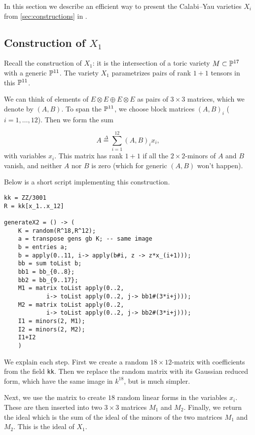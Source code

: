 In this section we describe an efficient way to present the Calabi--Yau varieties $X_i$ from \cref{sec:constructions} in \MM.

\subsection{Construction of $X_1$}

Recall the construction of $X_1$: it is the intersection of a toric variety $M \subset \P^{17}$ with a generic $\P^{11}$. The variety $X_1$ parametrizes pairs of rank $1+1$ tensors in this $\P^{11}$.

We can think of elements of $E \otimes E \oplus E \otimes E$ as pairs of $3 \times 3$ matrices, which we denote by $(A,B)$. To span the $\P^{11}$, we choose block matrices $\left(A,B\right)_i$ ($i=1,\ldots,12$). Then we form the sum

\[
A \stackrel \Delta = \sum_{i=1}^{12} (A,B)_i x_i,
\]
with variables $x_i$. This matrix has rank $1+1$ if all the $2 \times 2$-minors of $A$ and $B$ vanish, and neither $A$ nor $B$ is zero (which for generic $(A,B)$ won't happen). 

Below is a short \MM script implementing this construction.

\begin{minipage}{\linewidth}
\begin{lstlisting}[caption = Code for $X_1$, language=Macaulay2]
kk = ZZ/3001
R = kk[x_1..x_12]

generateX2 = () -> (
    K = random(R^18,R^12);
    a = transpose gens gb K; -- same image
    b = entries a;
    b = apply(0..11, i-> apply(b#i, z -> z*x_(i+1)));
    bb = sum toList b;
    bb1 = bb_{0..8};
    bb2 = bb_{9..17};
    M1 = matrix toList apply(0..2,
            i-> toList apply(0..2, j-> bb1#(3*i+j)));
    M2 = matrix toList apply(0..2,
            i-> toList apply(0..2, j-> bb2#(3*i+j)));
    I1 = minors(2, M1);
    I2 = minors(2, M2);
    I1+I2
    )
\end{lstlisting}
\end{minipage}

We explain each step. First we create a random $18 \times 12$-matrix with coefficients from the field \texttt{kk}. Then we replace the random matrix with its Gaussian reduced form, which have the same image in $k^{18}$, but is much simpler.

Next, we use the matrix to create $18$ random linear forms in the variables $x_i$. These are then inserted into two $3 \times 3$ matrices $M_1$ and $M_2$. Finally, we return the ideal which is the sum of the ideal of the minors of the two matrices $M_1$ and $M_2$. This is the ideal of $X_1$.

